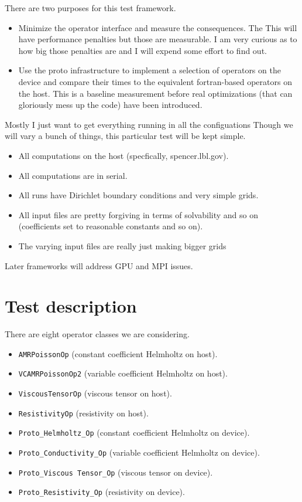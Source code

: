 \documentclass{article}
\begin{document}
There are two purposes for this test framework.
\begin{itemize}
\item Minimize the operator interface and measure the consequences.
  The This will have performance
  penalties but those are measurable.   I am very curious as to how
  big those penalties are and I will expend some effort to find out.
\item Use the proto infrastructure to implement a selection of
  operators on the device and compare their times to the equivalent
  fortran-based operators on the host.   This is a baseline
  measurement before real optimizations (that can gloriously mess up
  the code) have been introduced.
\end{itemize}
Mostly I just want to get everything running in all the configuations
Though we will vary a bunch of things, this particular test will be
kept simple.
\begin{itemize}
  \item All computations on the host (specfically, spencer.lbl.gov).
  \item All computations are in serial.
  \item All runs have Dirichlet boundary conditions and very simple
    grids.
  \item All input files are pretty forgiving in terms of solvability
    and so on (coefficients set to reasonable constants and so on).
  \item The varying input files are really just making bigger grids
\end{itemize}
 Later frameworks will address GPU and MPI issues.

 \section{Test description}

 There are eight operator classes we are considering.
 \begin{itemize}
 \item {\tt AMRPoissonOp} (constant coefficient Helmholtz on   host).
 \item {\tt VCAMRPoissonOp2} (variable coefficient Helmholtz on host).
 \item {\tt ViscousTensorOp} (viscous tensor on host).
 \item {\tt ResistivityOp} (resistivity on host).
 \item {\tt Proto\_Helmholtz\_Op} (constant coefficient Helmholtz on device).
 \item {\tt Proto\_Conductivity\_Op} (variable coefficient Helmholtz on device).
 \item {\tt Proto\_Viscous Tensor\_Op} (viscous tensor on device).
 \item {\tt Proto\_Resistivity\_Op} (resistivity on device).
 \end{itemize}
\end{document}

